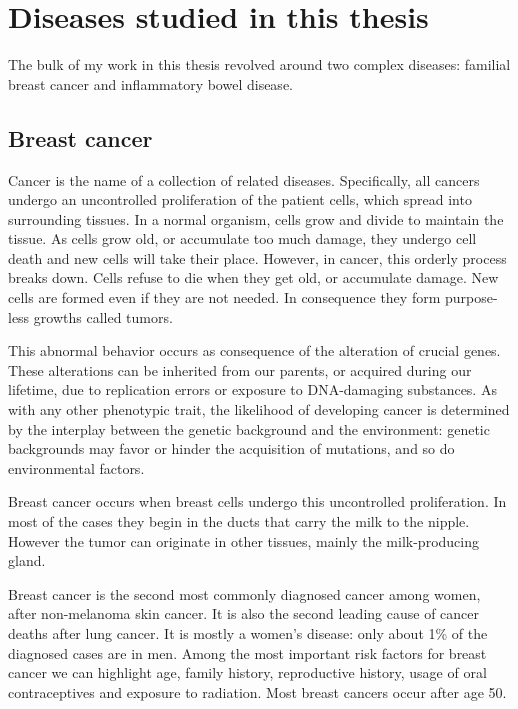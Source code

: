 \documentclass[
  11pt,
]{env/yjiao}
\begin{document}
\hypertarget{diseases-studied-in-this-thesis}{%
\section{Diseases studied in this thesis}\label{diseases-studied-in-this-thesis}}

The bulk of my work in this thesis revolved around two complex diseases: familial breast cancer and inflammatory bowel disease.

\hypertarget{breast-cancer}{%
\subsection{Breast cancer}\label{breast-cancer}}

Cancer is the name of a collection of related diseases. Specifically, all cancers undergo an uncontrolled proliferation of the patient cells, which spread into surrounding tissues. In a normal organism, cells grow and divide to maintain the tissue. As cells grow old, or accumulate too much damage, they undergo cell death and new cells will take their place. However, in cancer, this orderly process breaks down. Cells refuse to die when they get old, or accumulate damage. New cells are formed even if they are not needed. In consequence they form purpose-less growths called tumors.

This abnormal behavior occurs as consequence of the alteration of crucial genes. These alterations can be inherited from our parents, or acquired during our lifetime, due to replication errors or exposure to DNA-damaging substances. As with any other phenotypic trait, the likelihood of developing cancer is determined by the interplay between the genetic background and the environment: genetic backgrounds may favor or hinder the acquisition of mutations, and so do environmental factors.

Breast cancer occurs when breast cells undergo this uncontrolled proliferation. In most of the cases they begin in the ducts that carry the milk to the nipple. However the tumor can originate in other tissues, mainly the milk-producing gland.

Breast cancer is the second most commonly diagnosed cancer among women, after non-melanoma skin cancer. It is also the second leading cause of cancer deaths after lung cancer. It is mostly a women's disease: only about 1\% of the diagnosed cases are in men. Among the most important risk factors for breast cancer we can highlight age, family history, reproductive history, usage of oral contraceptives and exposure to radiation. Most breast cancers occur after age 50.
\end{document}
